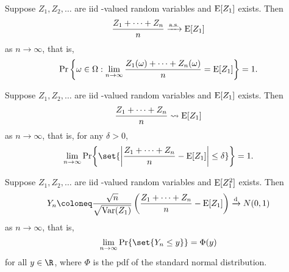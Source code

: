 \begin{fact} \label{thm:dtmc:slln}
    Suppose $Z_1, Z_2, \dots$ are iid \R-valued random variables and
    $\operatorname{\mathrm{E}}[Z_1]$ exists.
    Then \[
        \frac{Z_1 + \dots + Z_n}{n} \xrightarrow{\text{a.s.}} \operatorname{\mathrm{E}}[Z_1]
    \] as $n \to \infty$, that is, \[
        \Pr\left\{\omega \in \Omega : \lim_{n \to \infty}
        \frac{Z_1(\omega) + \dots + Z_n(\omega)}{n} = \operatorname{\mathrm{E}}[Z_1]\right\} = 1.
    \]
\end{fact}
\begin{fact} \label{thm:dtmc:wlln}
    Suppose $Z_1, Z_2, \dots$ are iid \R-valued random variables and
    $\operatorname{\mathrm{E}}[Z_1]$ exists.
    Then \[
        \frac{Z_1 + \dots + Z_n}{n} \leadsto \operatorname{\mathrm{E}}[Z_1]
    \] as $n \to \infty$, that is, for any $\delta > 0$, \[
        \lim_{n \to \infty}
        \Pr\set{\abs{\frac{Z_1 + \dots + Z_n}{n} - \E[Z_1]} \le \delta} = 1.
    \]
\end{fact}
\begin{fact} \label{thm:dtmc:clt}
    Suppose $Z_1, Z_2, \dots$ are iid \R-valued random variables and
    $\operatorname{\mathrm{E}}[Z_1^2]$ exists.
    Then \[
        Y_n \coloneq \frac{\sqrt n}{\sqrt{\Var(Z_1)}}
        \left(\frac{Z_1 + \dots + Z_n}{n} - \E[Z_1]\right) \dto N(0, 1)
    \] as $n \to \infty$, that is, \[
        \lim_{n \to \infty} \Pr\set{Y_n \le y} = \Phi(y)
    \] for all $y \in \R$, where $\Phi$ is the pdf of the standard normal
    distribution.
\end{fact}
